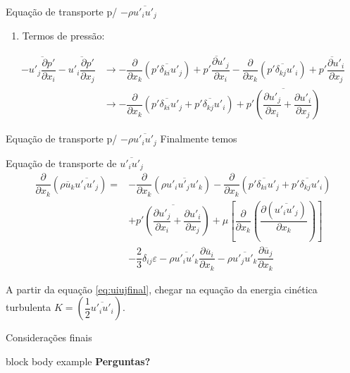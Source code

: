 \documentclass[10pt]{beamer}
\newcommand{\ddx}[2]{\dfrac{\partial #1}{\partial x_{#2}}}
\newcommand{\ddxp}[2]{\dfrac{\partial }{\partial x_{#2}}\left(#1\right)}
\newcommand{\m}[1]{\overline{#1}}
\begin{document}
\begin{frame}{Equação de transporte p/ $ -\rho \m{u'_i u'_j} $}
	\begin{enumerate}[$\bullet$]
		\item Termos de pressão:
	\end{enumerate}

	\begin{align*}
	- \m{u'_j\ddx{p'}{i}} - \m{u'_i\ddx{p'}{j}} 
	&\rightarrow - \ddxp{\m{p' \delta_{ki} u'_j}}{k} + \m{p'\ddx{u'_j}{i}} - \ddxp{\m{p' \delta_{kj} u'_i}}{k} + \m{p'\ddx{u'_i}{j}} \\
	&\rightarrow - \ddxp{\m{p' \delta_{ki} u'_j} + \m{p' \delta_{kj} u'_i}}{k} + \m{p'\left( \ddx{u'_j}{i} + \ddx{u'_i}{j} \right)}
	\end{align*}

\end{frame}

\begin{frame}{Equação de transporte p/ $ -\rho \m{u'_i u'_j} $}
	Finalmente temos
	
	\begin{block}{Equação de transporte de $ \m{u'_i u'_j} $}
		\begin{align}\label{eq:uiujfinal}
		\ddxp{\rho \m{u}_k \m{u'_i u'_j}}{k} = &- \ddxp{\rho \m{u'_iu'_ju'_k}}{k} - \ddxp{\m{p' \delta_{ki} u'_j} + \m{p' \delta_{kj} u'_i}}{k} \nonumber \\
		&+ \m{p'\left( \ddx{u'_j}{i} + \ddx{u'_i}{j} \right)} + \mu \left[ \ddxp{\ddx{(\m{u'_iu'_j})}{k}}{k} \right] \nonumber \\
		&- \dfrac{2}{3} \delta_{ij}\varepsilon
		- \rho \m{u'_i u'_k} \ddx{\m{u}_i}{k} - \rho \m{u'_j u'_k} \ddx{\m{u}_j}{k} 
		\end{align}
	\end{block}
	
	A partir da equação \ref{eq:uiujfinal}, chegar na equação da energia cinética turbulenta $ K = \left( \dfrac{1}{2} \m{u'_i u'_i} \right) $.
	
\end{frame}

\begin{frame}[b]{Considerações finais}
	\vfill
	\begin{beamercolorbox}[wd=\textwidth,rounded=true,shadow=true]{block body example}
		\vfill
		\centering \textbf{Perguntas?}
		\vspace*{10pt}
	\end{beamercolorbox}
	\vfill
	\doclicenseThis
\end{frame}
\end{document}
